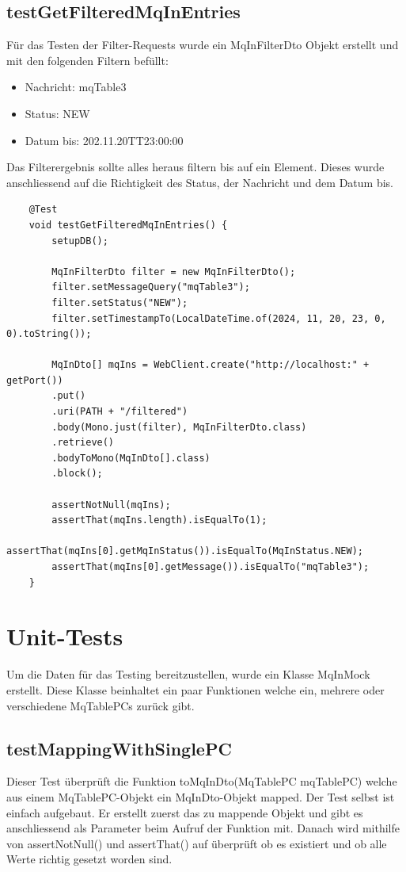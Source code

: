 \subsection{testGetFilteredMqInEntries}
Für das Testen der Filter-Requests wurde ein MqInFilterDto Objekt erstellt und mit den folgenden Filtern befüllt:

\begin{itemize}
	\item Nachricht: mqTable3
	\item Status: NEW
	\item Datum bis: 202.11.20TT23:00:00
\end{itemize}

Das Filterergebnis sollte alles heraus filtern bis auf ein Element. Dieses wurde anschliessend auf die Richtigkeit des Status, der Nachricht und dem Datum bis.

\begin{verbatim}
	@Test
	void testGetFilteredMqInEntries() {
		setupDB();
		
		MqInFilterDto filter = new MqInFilterDto();
		filter.setMessageQuery("mqTable3");
		filter.setStatus("NEW");
		filter.setTimestampTo(LocalDateTime.of(2024, 11, 20, 23, 0, 0).toString());
		
		MqInDto[] mqIns = WebClient.create("http://localhost:" + getPort())
		.put()
		.uri(PATH + "/filtered")
		.body(Mono.just(filter), MqInFilterDto.class)
		.retrieve()
		.bodyToMono(MqInDto[].class)
		.block();
		
		assertNotNull(mqIns);
		assertThat(mqIns.length).isEqualTo(1);
		assertThat(mqIns[0].getMqInStatus()).isEqualTo(MqInStatus.NEW);
		assertThat(mqIns[0].getMessage()).isEqualTo("mqTable3");
	}
\end{verbatim}

\section{Unit-Tests}
Um die Daten für das Testing bereitzustellen, wurde ein Klasse MqInMock erstellt. Diese Klasse beinhaltet ein paar Funktionen welche ein, mehrere oder verschiedene MqTablePCs zurück gibt.

\subsection{testMappingWithSinglePC}
Dieser Test überprüft die Funktion toMqInDto(MqTablePC mqTablePC) welche aus einem MqTablePC-Objekt ein MqInDto-Objekt mapped. Der Test selbst ist einfach aufgebaut. Er erstellt zuerst das zu mappende Objekt und gibt es anschliessend als Parameter beim Aufruf der Funktion mit. Danach wird mithilfe von assertNotNull() und assertThat() auf überprüft ob es existiert und ob alle Werte richtig gesetzt worden sind.

